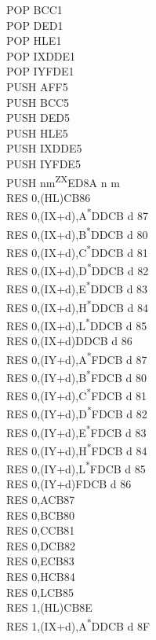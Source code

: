 \documentclass[twoside,openright,a4paper]{book}
\begin{document}
\begin{multicols}{3}
{\begin{tabbing}
	POP BC\>C1\\
	POP DE\>D1\\
	POP HL\>E1\\
	POP IX\>DDE1\\
	POP IY\>FDE1\\
	PUSH AF\>F5\\
	PUSH BC\>C5\\
	PUSH DE\>D5\\
	PUSH HL\>E5\\
	PUSH IX\>DDE5\\
	PUSH IY\>FDE5\\
	PUSH nm\textsuperscript{ZX}\>ED8A n m\\
	RES 0,(HL)\>CB86\\
	RES 0,(IX+d),A\textsuperscript{*}\>DDCB d 87\\
	RES 0,(IX+d),B\textsuperscript{*}\>DDCB d 80\\
	RES 0,(IX+d),C\textsuperscript{*}\>DDCB d 81\\
	RES 0,(IX+d),D\textsuperscript{*}\>DDCB d 82\\
	RES 0,(IX+d),E\textsuperscript{*}\>DDCB d 83\\
	RES 0,(IX+d),H\textsuperscript{*}\>DDCB d 84\\
	RES 0,(IX+d),L\textsuperscript{*}\>DDCB d 85\\
	RES 0,(IX+d)\>DDCB d 86\\
	RES 0,(IY+d),A\textsuperscript{*}\>FDCB d 87\\
	RES 0,(IY+d),B\textsuperscript{*}\>FDCB d 80\\
	RES 0,(IY+d),C\textsuperscript{*}\>FDCB d 81\\
	RES 0,(IY+d),D\textsuperscript{*}\>FDCB d 82\\
	RES 0,(IY+d),E\textsuperscript{*}\>FDCB d 83\\
	RES 0,(IY+d),H\textsuperscript{*}\>FDCB d 84\\
	RES 0,(IY+d),L\textsuperscript{*}\>FDCB d 85\\
	RES 0,(IY+d)\>FDCB d 86\\
	RES 0,A\>CB87\\
	RES 0,B\>CB80\\
	RES 0,C\>CB81\\
	RES 0,D\>CB82\\
	RES 0,E\>CB83\\
	RES 0,H\>CB84\\
	RES 0,L\>CB85\\
	RES 1,(HL)\>CB8E\\
	RES 1,(IX+d),A\textsuperscript{*}\>DDCB d 8F\\

\end{tabbing}}
\end{multicols}
\end{document}
